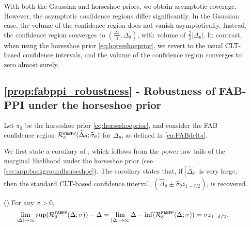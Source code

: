 \begin{remark}\label{rem:fabppi_asymptotic}
    With both the Gaussian and horseshoe priors, we obtain asymptotic coverage. However, the asymptotic confidence regions differ significantly. In the Gaussian case, the volume of the confidence region does not vanish asymptotically. Instead, the confidence region converges to $(\frac{\Delta_\theta}{3},\Delta_\theta)$, with volume of $\frac{2}{3}|\Delta_\theta|$.
    In contrast, when using the horseshoe prior \eqref{eq:horseshoeprior}, we revert to the usual CLT-based confidence intervals, and the volume of the confidence region converges to zero almost surely.
\end{remark}

\subsection{\cref{prop:fabppi_robustness} - Robustness of FAB-PPI under the horseshoe prior}
\label{app:thm:fabppi_robustness}
Let $\pi_0$ be the horseshoe prior \eqref{eq:horseshoeprior}, and consider the FAB confidence region $\mathcal R^{\mathrm{\texttt{FABPP}}}_\delta(\widehat{\Delta}_\theta; \widehat{\sigma}_\theta )$ for $\Delta_\theta$, as defined in \cref{eq:FABdelta}.

We first state a corollary of \citet[Theorem 2.2]{Cortinovis2024}, which follows from the power-law tails of the marginal likelihood under the horseshoe prior (see \cref{sec:app:backgroundhorseshoe}). The corollary states that, if $|\widehat{\Delta}_\theta|$ is very large, then the standard CLT-based confidence interval, $(\widehat{\Delta}_\theta\pm \widehat{\sigma}_\theta z_{1-\delta/2})$, is recovered.

\begin{corollary}(\citet[Theorem 2.2]{Cortinovis2024})
    \label{prop:limitstandardCI}
    For any $\sigma>0$,
    \begin{align*}
        \lim_{|\Delta|\to\infty} \sup(\mathcal R^{\mathrm{\texttt{FABPP}}}_\delta(\Delta; \sigma )) - \Delta&=\lim_{|\Delta|\to\infty} \Delta-\inf(\mathcal R^{\mathrm{\texttt{FABPP}}}_\delta(\Delta; \sigma))=\sigma z_{1-\delta/2}.
    \end{align*}
\end{corollary}


